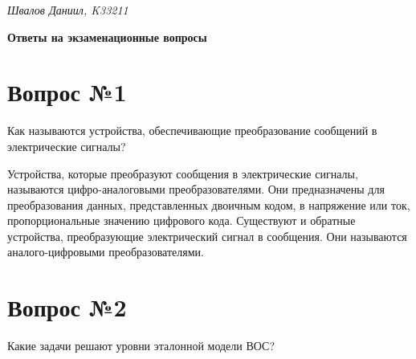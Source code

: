 \documentclass[a4paper, 14pt]{extarticle}
\begin{document}
\begin{flushright}
  \textit{Швалов Даниил, K33211}
\end{flushright}

\begin{center}
  \textbf{Ответы на экзаменационные вопросы}
\end{center}

\section*{Вопрос №1}

\begin{siderules}
  Как называются устройства, обеспечивающие преобразование сообщений в
  электрические сигналы?
\end{siderules}

Устройства, которые преобразуют сообщения в электрические сигналы, называются
цифро-аналоговыми преобразователями. Они предназначены для преобразования
данных, представленных двоичным кодом, в напряжение или ток, пропорциональные
значению цифрового кода. Существуют и обратные устройства, преобразующие
электрический сигнал в сообщения. Они называются аналого-цифровыми
преобразователями.

\section*{Вопрос №2}

\begin{siderules}
  Какие задачи решают уровни эталонной модели ВОС?
\end{siderules}
\end{document}
